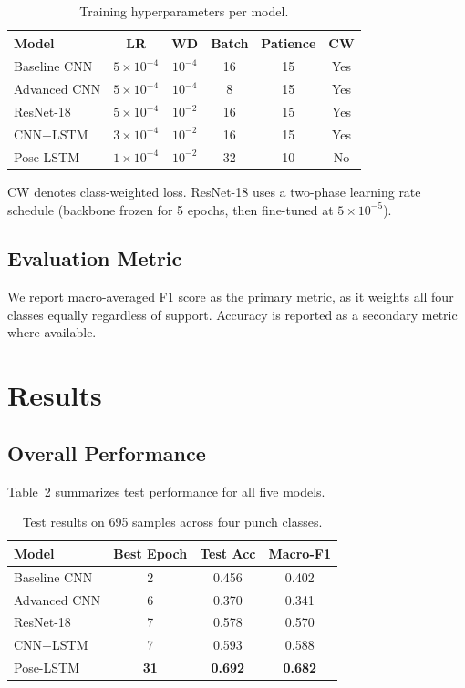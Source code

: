 \documentclass[conference]{IEEEtran}
\begin{document}
\begin{table}[h]
\centering
\caption{Training hyperparameters per model.}
\label{tab:hparams}
\begin{tabular}{lccccc}
\toprule
\textbf{Model} & \textbf{LR} & \textbf{WD} & \textbf{Batch} &
\textbf{Patience} & \textbf{CW} \\
\midrule
Baseline CNN   & $5\times10^{-4}$ & $10^{-4}$  & 16 & 15 & Yes \\
Advanced CNN   & $5\times10^{-4}$ & $10^{-4}$  &  8 & 15 & Yes \\
ResNet-18      & $5\times10^{-4}$ & $10^{-2}$  & 16 & 15 & Yes \\
CNN+LSTM       & $3\times10^{-4}$ & $10^{-2}$  & 16 & 15 & Yes \\
Pose-LSTM      & $1\times10^{-4}$ & $10^{-2}$  & 32 & 10 & No  \\
\bottomrule
\end{tabular}
\end{table}

CW denotes class-weighted loss. ResNet-18 uses a two-phase learning rate
schedule (backbone frozen for 5 epochs, then fine-tuned at $5\times10^{-5}$).

\subsection{Evaluation Metric}
We report macro-averaged F1 score as the primary metric, as it weights all
four classes equally regardless of support. Accuracy is reported as a
secondary metric where available.

\section{Results}

\subsection{Overall Performance}

Table~\ref{tab:results} summarizes test performance for all five models.

\begin{table}[h]
\centering
\caption{Test results on 695 samples across four punch classes.}
\label{tab:results}
\begin{tabular}{lccc}
\toprule
\textbf{Model} & \textbf{Best Epoch} & \textbf{Test Acc} &
\textbf{Macro-F1} \\
\midrule
Baseline CNN   &  2 & 0.456 & 0.402 \\
Advanced CNN   &  6 & 0.370 & 0.341 \\
ResNet-18      &  7 & 0.578 & 0.570 \\
CNN+LSTM       &  7 & 0.593 & 0.588 \\
Pose-LSTM      & \textbf{31} & \textbf{0.692} & \textbf{0.682} \\
\bottomrule
\end{tabular}
\end{table}
\end{document}
